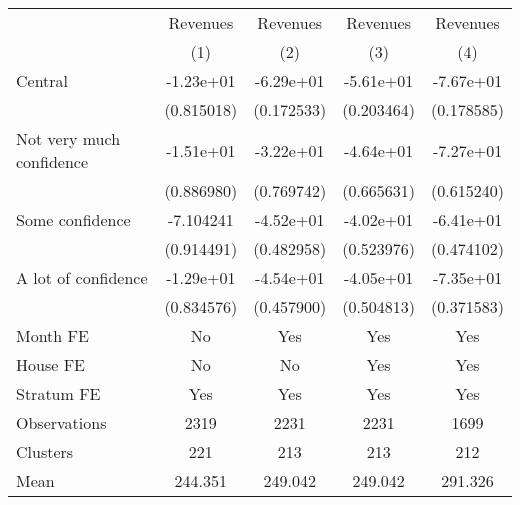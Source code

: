 {
\def\sym#1{\ifmmode^{#1}\else\(^{#1}\)\fi}
\begin{tabular}{l*{4}{c}}
\toprule
                &\multicolumn{1}{c}{Revenues}&\multicolumn{1}{c}{Revenues}&\multicolumn{1}{c}{Revenues}&\multicolumn{1}{c}{Revenues}\\
                &\multicolumn{1}{c}{(1)}         &\multicolumn{1}{c}{(2)}         &\multicolumn{1}{c}{(3)}         &\multicolumn{1}{c}{(4)}         \\
\midrule
Central         &-1.23e+01         &-6.29e+01         &-5.61e+01         &-7.67e+01         \\
                &(0.815018)         &(0.172533)         &(0.203464)         &(0.178585)         \\
Not very much confidence&-1.51e+01         &-3.22e+01         &-4.64e+01         &-7.27e+01         \\
                &(0.886980)         &(0.769742)         &(0.665631)         &(0.615240)         \\
Some confidence &-7.104241         &-4.52e+01         &-4.02e+01         &-6.41e+01         \\
                &(0.914491)         &(0.482958)         &(0.523976)         &(0.474102)         \\
A lot of confidence&-1.29e+01         &-4.54e+01         &-4.05e+01         &-7.35e+01         \\
                &(0.834576)         &(0.457900)         &(0.504813)         &(0.371583)         \\
Month FE        &       No         &      Yes         &      Yes         &      Yes         \\
House FE        &       No         &       No         &      Yes         &      Yes         \\
Stratum FE      &      Yes         &      Yes         &      Yes         &      Yes         \\
\midrule
Observations    &     2319         &     2231         &     2231         &     1699         \\
Clusters        &      221         &      213         &      213         &      212         \\
Mean            &  244.351         &  249.042         &  249.042         &  291.326         \\
\bottomrule
\end{tabular}
}
